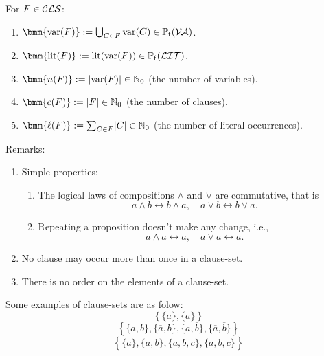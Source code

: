 \documentclass[12pt]{book}
\begin{document}
\begin{defi}\label{def:clsbasicops}
  For $F \in \mathcal{CLS}$:
  \begin{enumerate}
  \item $\bmm{\var(F)} := \bc_{C \in F} \var(C) \in \pote(\Va)$.
  \item $\bmm{\lit(F)} := \lit(\var(F)) \in \pote(\Lit)$.
  \item $\bmm{n(F)} := \abs{\var(F)} \in \NNZ$ (the number of variables).
  \item $\bmm{c(F)} := \abs{F} \in \NNZ$ (the number of clauses).
  \item $\bmm{\ell(F)} := \sum_{C \in F} \abs{C} \in \NNZ$ (the number of literal occurrences).
  \end{enumerate}
\end{defi}
Remarks:
\begin{enumerate}
\item Simple properties:
  \begin{enumerate}
  \item The logical laws of compositions $\wedge$ and $\vee$ are commutative, that is
  \begin{displaymath}
     a\wedge b \leftrightarrow b\wedge a, \quad  a\vee b \leftrightarrow b\vee a.
  \end{displaymath} 
  \item Repeating a proposition doesn't make any change, i.e.,
     \begin{displaymath}
      a\wedge a \leftrightarrow a, \quad  a\vee a \leftrightarrow a.
    \end{displaymath}
 \end{enumerate}
 \item No clause may occur more than once in a clause-set.
 \item There is no order on the elements of a clause-set.
\end{enumerate}
\begin{examp}\label{exp:cls}
Some examples of clause-sets are as folow:
\begin{displaymath}
     \left\{\{a\}, \{\overline{a}\}\right\}
  \end{displaymath} 
  \begin{displaymath}
     \left\{\{a,b\}, \{\overline{a},b\}, \{a, \overline{b}\}, \{\overline{a},\overline{b}\}\right\}
  \end{displaymath}
  \begin{displaymath}
     \left\{\{a\}, \{\overline{a},b\}, \{\overline{a}, \overline{b}, c\}, \{\overline{a}, \overline{b}, \overline{c}\}\right\}
  \end{displaymath}
\end{examp}
\end{document}
